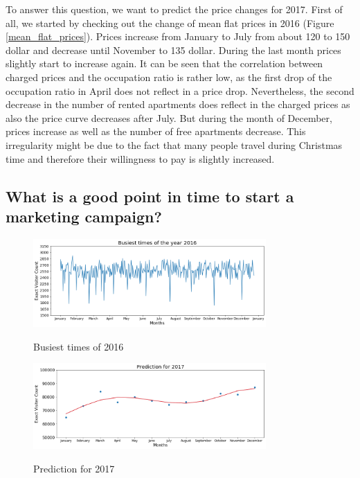 \documentclass[journal]{IEEEtran}
\begin{document}
To answer this question, we want to predict the price changes for 2017. First of all, we started by checking out the change of mean flat prices in 2016 (Figure \ref{mean_flat_prices}). 
Prices increase from January to July from about 120 to 150 dollar and decrease until November to 135 dollar. During the last month prices slightly start to increase again. It can be seen that the correlation between charged prices and the occupation ratio is rather low, as the first drop of the occupation ratio in April does not reflect in a price drop. Nevertheless, the second decrease in the number of rented apartments does reflect in the charged prices as also the price curve decreases after July. But during the month of December, prices increase as well as the number of free apartments decrease. This irregularity might be due to the fact that many people travel during Christmas time and therefore their willingness to pay is slightly increased. 

\subsection{What is a good point in time to start a marketing campaign?}

\begin{figure}
  \begin{center}
  \includegraphics[width=3.5in]{photo/5_busiest_times_2016.png}\\
  \caption{Busiest times of 2016}\label{busiest_times}
  \end{center}
\end{figure}

\begin{figure}
  \begin{center}
  \includegraphics[width=3.5in]{photo/6_prediction_2017.png}\\
  \caption{Prediction for 2017}\label{prediction_2017}
  \end{center}
\end{figure}
\end{document}

